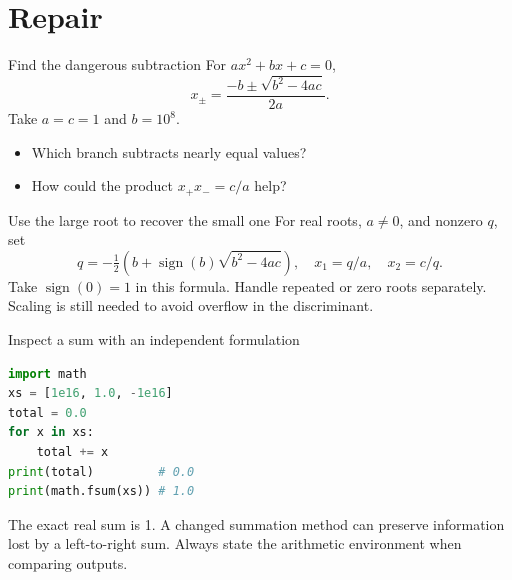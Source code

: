 \documentclass[14pt,aspectratio=1610]{beamer}
\begin{document}
\section{Repair}
\begin{frame}[label=exercise]{Find the dangerous subtraction}
For $ax^2+bx+c=0$,
\[
 x_{\pm}=\frac{-b\pm\sqrt{b^2-4ac}}{2a}.
\]
Take $a=c=1$ and $b=10^8$.
\begin{itemize}
\item Which branch subtracts nearly equal values?
\item How could the product $x_+x_-=c/a$ help?
\end{itemize}
\end{frame}
\begin{frame}{Use the large root to recover the small one}
For real roots, $a\ne0$, and nonzero $q$, set
\[
 q=-\tfrac12\left(b+\operatorname{sign}(b)\sqrt{b^2-4ac}\right),
 \quad x_1=q/a,\quad x_2=c/q.
\]
\small Take $\operatorname{sign}(0)=1$ in this formula. Handle repeated or zero roots separately. Scaling is still needed to avoid overflow in the discriminant.
\medskip
\hyperlink{exercise}{}
\end{frame}
\begin{frame}[fragile]{Inspect a sum with an independent formulation}
\begin{lstlisting}[language=Python]
import math
xs = [1e16, 1.0, -1e16]
total = 0.0
for x in xs:
    total += x
print(total)         # 0.0
print(math.fsum(xs)) # 1.0
\end{lstlisting}
\small The exact real sum is 1. A changed summation method can preserve information lost by a left-to-right sum. Always state the arithmetic environment when comparing outputs.
\end{frame}
\end{document}
